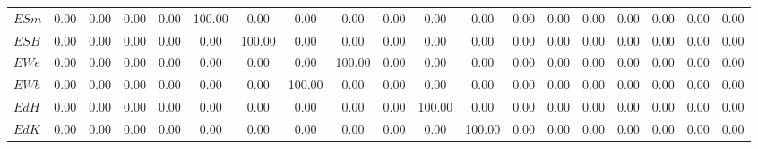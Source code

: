 \begin{center}
\begin{longtable}{lcccccccccccccccccc}
$ESm                $	 & 	             0.00	 & 	             0.00	 & 	             0.00	 & 	             0.00	 & 	           100.00	 & 	             0.00	 & 	             0.00	 & 	             0.00	 & 	             0.00	 & 	             0.00	 & 	             0.00	 & 	             0.00	 & 	             0.00	 & 	             0.00	 & 	             0.00	 & 	             0.00	 & 	             0.00	 & 	             0.00 \\ 
$ESB                $	 & 	             0.00	 & 	             0.00	 & 	             0.00	 & 	             0.00	 & 	             0.00	 & 	           100.00	 & 	             0.00	 & 	             0.00	 & 	             0.00	 & 	             0.00	 & 	             0.00	 & 	             0.00	 & 	             0.00	 & 	             0.00	 & 	             0.00	 & 	             0.00	 & 	             0.00	 & 	             0.00 \\ 
$EWe                $	 & 	             0.00	 & 	             0.00	 & 	             0.00	 & 	             0.00	 & 	             0.00	 & 	             0.00	 & 	             0.00	 & 	           100.00	 & 	             0.00	 & 	             0.00	 & 	             0.00	 & 	             0.00	 & 	             0.00	 & 	             0.00	 & 	             0.00	 & 	             0.00	 & 	             0.00	 & 	             0.00 \\ 
$EWb                $	 & 	             0.00	 & 	             0.00	 & 	             0.00	 & 	             0.00	 & 	             0.00	 & 	             0.00	 & 	           100.00	 & 	             0.00	 & 	             0.00	 & 	             0.00	 & 	             0.00	 & 	             0.00	 & 	             0.00	 & 	             0.00	 & 	             0.00	 & 	             0.00	 & 	             0.00	 & 	             0.00 \\ 
$EdH                $	 & 	             0.00	 & 	             0.00	 & 	             0.00	 & 	             0.00	 & 	             0.00	 & 	             0.00	 & 	             0.00	 & 	             0.00	 & 	             0.00	 & 	           100.00	 & 	             0.00	 & 	             0.00	 & 	             0.00	 & 	             0.00	 & 	             0.00	 & 	             0.00	 & 	             0.00	 & 	             0.00 \\ 
$EdK                $	 & 	             0.00	 & 	             0.00	 & 	             0.00	 & 	             0.00	 & 	             0.00	 & 	             0.00	 & 	             0.00	 & 	             0.00	 & 	             0.00	 & 	             0.00	 & 	           100.00	 & 	             0.00	 & 	             0.00	 & 	             0.00	 & 	             0.00	 & 	             0.00	 & 	             0.00	 & 	             0.00 \\ 

\end{longtable}
\end{center}
